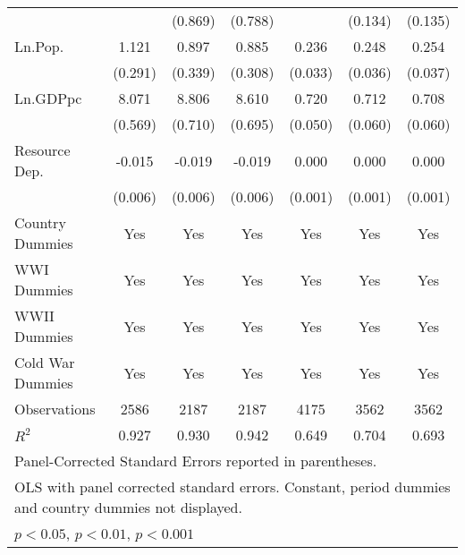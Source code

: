 \begin{table}[htbp]
{\begin{tabular}{l*{6}{c}}
			&                     &     (0.869)         &     (0.788)         &                     &     (0.134)         &     (0.135)         \\
			[1em]
			Ln.Pop.             &       1.121\sym{***}&       0.897\sym{**} &       0.885\sym{**} &       0.236\sym{***}&       0.248\sym{***}&       0.254\sym{***}\\
			&     (0.291)         &     (0.339)         &     (0.308)         &     (0.033)         &     (0.036)         &     (0.037)         \\
			[1em]
			Ln.GDPpc            &       8.071\sym{***}&       8.806\sym{***}&       8.610\sym{***}&       0.720\sym{***}&       0.712\sym{***}&       0.708\sym{***}\\
			&     (0.569)         &     (0.710)         &     (0.695)         &     (0.050)         &     (0.060)         &     (0.060)         \\
			[1em]
			Resource Dep.       &      -0.015\sym{*}  &      -0.019\sym{**} &      -0.019\sym{**} &       0.000         &       0.000         &       0.000         \\
			&     (0.006)         &     (0.006)         &     (0.006)         &     (0.001)         &     (0.001)         &     (0.001)         \\
			[1em]
			Country Dummies     &         Yes         &         Yes         &         Yes         &         Yes         &         Yes         &         Yes         \\
			[1em]
			WWI Dummies         &         Yes         &         Yes         &         Yes         &         Yes         &         Yes         &         Yes         \\
			[1em]
			WWII Dummies        &         Yes         &         Yes         &         Yes         &         Yes         &         Yes         &         Yes         \\
			[1em]
			Cold War Dummies    &         Yes         &         Yes         &         Yes         &         Yes         &         Yes         &         Yes         \\
			\hline
			Observations        &        2586         &        2187         &        2187         &        4175         &        3562         &        3562         \\
			\(R^{2}\)           &       0.927         &       0.930         &       0.942         &       0.649         &       0.704         &       0.693         \\
			\hline\hline
			\multicolumn{7}{l}{\footnotesize Panel-Corrected Standard Errors reported in parentheses.}\\
			\multicolumn{7}{l}{\footnotesize OLS with panel corrected standard errors. Constant, period dummies and country dummies not displayed.}\\
			\multicolumn{7}{l}{\footnotesize \sym{*} \(p<0.05\), \sym{**} \(p<0.01\), \sym{***} \(p<0.001\)}\\
	\end{tabular}}
	\label{tab:table1}
\end{table}